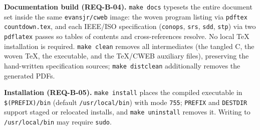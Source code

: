 \documentclass[12pt]{article}
\newcommand{\code}[1]{\texttt{#1}}
\begin{document}
\medskip\noindent
\textbf{Documentation build (REQ-B-04).}  \code{make docs} typesets the
entire document set inside the same \code{evansjr/cweb} image: the woven
program listing via \code{pdftex countdown.tex}, and each IEEE/ISO
specification (\code{conops}, \code{srs}, \code{sdd}, \code{stp}) via two
\code{pdflatex} passes so tables of contents and cross-references resolve.
No local \TeX{} installation is required.  \code{make clean} removes all
intermediates (the tangled C, the woven \TeX, the executable, and the
\TeX/CWEB auxiliary files), preserving the hand-written specification
sources; \code{make distclean} additionally removes the generated PDFs.

\medskip\noindent
\textbf{Installation (REQ-B-05).}  \code{make install} places the compiled
executable in \code{\$(PREFIX)/bin} (default \code{/usr/local/bin}) with
mode \code{755}; \code{PREFIX} and \code{DESTDIR} support staged or
relocated installs, and \code{make uninstall} removes it.  Writing to
\code{/usr/local/bin} may require \code{sudo}.
\end{document}
